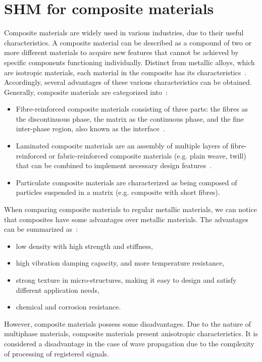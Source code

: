 \section[SHM for composite materials]{SHM for composite materials}
\label{sec21}
Composite materials are widely used in various industries, due to their useful character\-istics. 
A composite material can be described as a compound of two or more different materials to acquire new features that cannot be achieved by specific components functioning individually.
Distinct from metallic alloys, which are isotropic materials, each material in the composite has its characteristics~\cite{Campbell2010}.
Accordingly, several advantages of these various characteristics can be obtained. 
Generally, composite materials are categorized into~\cite{Jones1999}:
\begin{itemize}
	\item Fibre-reinforced composite materials consisting of three parts: the fibres as the discontinuous phase, the matrix as the continuous phase, and the fine inter-phase region, also known as the interface~\cite{Cantwell1991}.
	\item Laminated composite materials are an assembly of multiple layers of fibre-reinforc\-ed or fabric-reinforced composite materials (e.g. plain weave, twill) that can be combined to implement necessary design features~\cite{Ramirez1999}.
	\item Particulate composite materials are characterized as being composed of particles suspended in a matrix (e.g. composite with short fibres).
\end{itemize}

When comparing composite materials to regular metallic materials, we can notice that composites have some advantages over metallic materials. 
The advantages can be summarized as~\cite{Campbell2010}:
\begin{itemize}
	\item low density with high strength and stiffness,
	\item high vibration damping capacity, and more temperature resistance,
	\item strong texture in micro-structures, making it easy to design and satisfy different application needs, 
	\item chemical and corrosion resistance.	
\end{itemize}

However, composite materials possess some disadvantages.
Due to the nature of multiphase materials, composite materials present anisotropic characteristics. 
It is considered a disadvantage in the case of wave propagation due to the complexity of processing of registered signals. 

